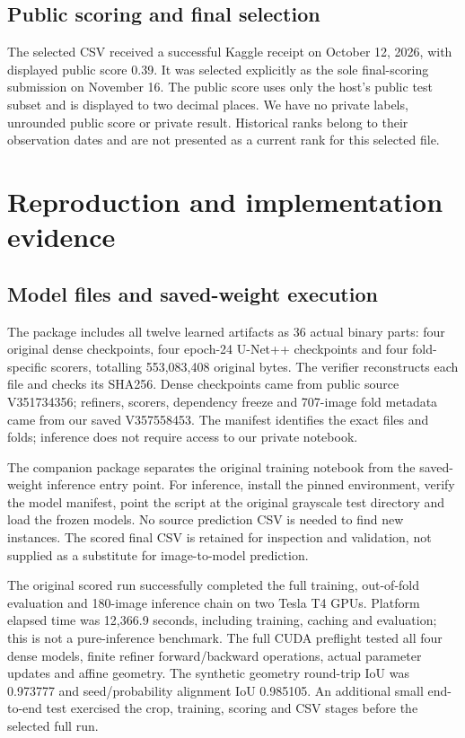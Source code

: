 \documentclass[sigconf]{acmart}
\begin{document}
\subsection{Public scoring and final selection}
The selected CSV received a successful Kaggle receipt on October 12, 2026, with displayed public score 0.39. It was selected explicitly as the sole final-scoring submission on November 16. The public score uses only the host's public test subset and is displayed to two decimal places. We have no private labels, unrounded public score or private result. Historical ranks belong to their observation dates and are not presented as a current rank for this selected file.

\clearpage
\section{Reproduction and implementation evidence}
\subsection{Model files and saved-weight execution}
The package includes all twelve learned artifacts as 36 actual binary parts: four original dense checkpoints, four epoch-24 U-Net++ checkpoints and four fold-specific scorers, totalling 553,083,408 original bytes. The verifier reconstructs each file and checks its SHA256. Dense checkpoints came from public source V351734356; refiners, scorers, dependency freeze and 707-image fold metadata came from our saved V357558453. The manifest identifies the exact files and folds; inference does not require access to our private notebook.

The companion package separates the original training notebook from the saved-weight inference entry point. For inference, install the pinned environment, verify the model manifest, point the script at the original grayscale test directory and load the frozen models. No source prediction CSV is needed to find new instances. The scored final CSV is retained for inspection and validation, not supplied as a substitute for image-to-model prediction.

The original scored run successfully completed the full training, out-of-fold evaluation and 180-image inference chain on two Tesla T4 GPUs. Platform elapsed time was 12,366.9 seconds, including training, caching and evaluation; this is not a pure-inference benchmark. The full CUDA preflight tested all four dense models, finite refiner forward/backward operations, actual parameter updates and affine geometry. The synthetic geometry round-trip IoU was 0.973777 and seed/probability alignment IoU 0.985105. An additional small end-to-end test exercised the crop, training, scoring and CSV stages before the selected full run.
\end{document}

